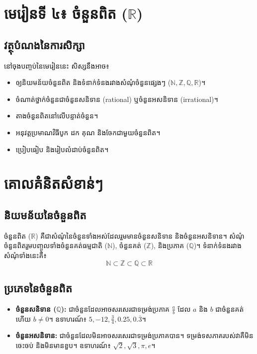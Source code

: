 \clearpage
\setcounter{section}{0}

\section*{មេរៀនទី ៤៖ ចំនួនពិត ($\mathbb{R}$)}

\subsection*{វត្ថុបំណងនៃការសិក្សា}
នៅចុងបញ្ចប់នៃមេរៀននេះ សិស្សនឹងអាច៖
\begin{itemize}[label=-]
    \item ឲ្យនិយមន័យចំនួនពិត និងទំនាក់ទំនងរវាងសំណុំចំនួនផ្សេងៗ ($\mathbb{N}, \mathbb{Z}, \mathbb{Q}, \mathbb{R}$)។
    \item ចំណាត់ថ្នាក់ចំនួនជាចំនួនសនិទាន (rational) ឬចំនួនអសនិទាន (irrational)។
    \item តាងចំនួនពិតនៅលើបន្ទាត់ចំនួន។
    \item អនុវត្តប្រមាណវិធីបូក ដក គុណ និងចែកជាមួយចំនួនពិត។
    \item ប្រៀបធៀប និងរៀបលំដាប់ចំនួនពិត។
\end{itemize}

\section{គោលគំនិតសំខាន់ៗ}

\subsection{និយមន័យនៃចំនួនពិត}
ចំនួនពិត (\(\mathbb{R}\)) គឺជាសំណុំនៃចំនួនទាំងអស់ដែលរួមមានចំនួនសនិទាន និងចំនួនអសនិទាន។ សំណុំចំនួនពិតរួមបញ្ចូលទាំងចំនួនគត់ធម្មជាតិ ($\mathbb{N}$), ចំនួនគត់ ($\mathbb{Z}$), និងប្រភាគ ($\mathbb{Q}$)។
ទំនាក់ទំនងរវាងសំណុំទាំងនេះគឺ៖
\[ \mathbb{N} \subset \mathbb{Z} \subset \mathbb{Q} \subset \mathbb{R} \]

\subsection{ប្រភេទនៃចំនួនពិត}
\begin{itemize}[label=-]
    \item \textbf{ចំនួនសនិទាន ($\mathbb{Q}$):} ជាចំនួនដែលអាចសរសេរជាទម្រង់ប្រភាគ $\frac{a}{b}$ ដែល $a$ និង $b$ ជាចំនួនគត់ ហើយ $b \neq 0$។ ឧទាហរណ៍៖ $5, -12, \frac{3}{4}, 0.25, 0.\overline{3}$។
    \item \textbf{ចំនួនអសនិទាន:} ជាចំនួនដែលមិនអាចសរសេរជាទម្រង់ប្រភាគបាន។ ទម្រង់ទសភាគរបស់វាគឺមិនចេះចប់ និងមិនមានខួប។ ឧទាហរណ៍៖ $\sqrt{2}, \sqrt{3}, \pi, e$។
\end{itemize}

